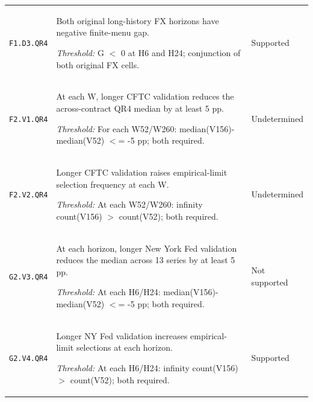 \documentclass[10pt,a4paper]{article}
\begin{document}
{\begin{longtable}{p{2.0cm}p{10.5cm}p{2.5cm}}
\texttt{F1.\allowbreak{}D3.\allowbreak{}QR4} & Both original long-history FX horizons have negative finite-menu gap.\par\emph{Threshold:} G \ensuremath{<} 0 at H6 and H24; conjunction of both original FX cells. & Supported \\[3pt]
\texttt{F2.\allowbreak{}V1.\allowbreak{}QR4} & At each W, longer CFTC validation reduces the across-contract QR4 median by at least 5 pp.\par\emph{Threshold:} For each W52/\allowbreak{}W260: median(V156)-median(V52) \ensuremath{<}=\allowbreak{} -5 pp; both required. & Undetermined \\[3pt]
\texttt{F2.\allowbreak{}V2.\allowbreak{}QR4} & Longer CFTC validation raises empirical-limit selection frequency at each W.\par\emph{Threshold:} At each W52/\allowbreak{}W260: infinity count(V156) \ensuremath{>} count(V52); both required. & Undetermined \\[3pt]
\texttt{G2.\allowbreak{}V3.\allowbreak{}QR4} & At each horizon, longer New York Fed validation reduces the median across 13 series by at least 5 pp.\par\emph{Threshold:} At each H6/\allowbreak{}H24: median(V156)-median(V52) \ensuremath{<}=\allowbreak{} -5 pp; both required. & Not supported \\[3pt]
\texttt{G2.\allowbreak{}V4.\allowbreak{}QR4} & Longer NY Fed validation increases empirical-limit selections at each horizon.\par\emph{Threshold:} At each H6/\allowbreak{}H24: infinity count(V156) \ensuremath{>} count(V52); both required. & Supported \\[3pt]
\bottomrule\end{longtable}
}

\FloatBarrier
\end{document}

